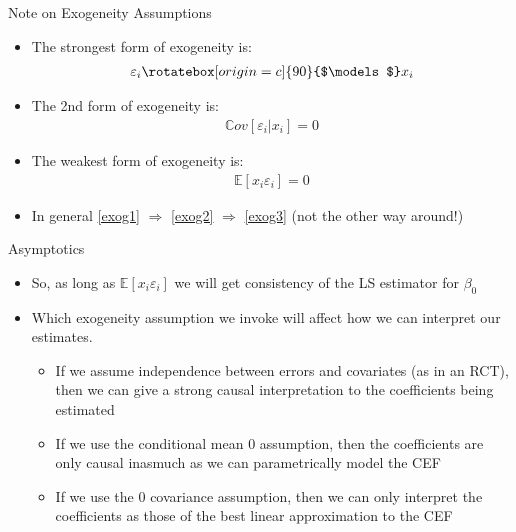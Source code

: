 \documentclass[fleqn, 10pt]{beamer}
\newcommand{\Cov}{\mathbb{C}ov}
\newcommand{\E}{\mathbb{E}}
\newcommand{\indep}{\rotatebox[origin=c]{90}{$\models$}}
\begin{document}
\begin{frame}{Note on Exogeneity Assumptions}
	
	\begin{itemize}
		\item The strongest form of exogeneity is:
		\begin{align} \label{exog1}
		\varepsilon_i \indep x_i
		\end{align}
		\item The 2nd form of exogeneity is:
		\begin{align} \label{exog2}
		\Cov[\varepsilon_i | x_i] = 0
		\end{align}
		\item The weakest form of exogeneity is:
		\begin{align} \label{exog3}
		\E[x_i \varepsilon_i] = 0
		\end{align}
		\item In general \eqref{exog1} \( \Rightarrow \) \eqref{exog2} \( \Rightarrow \) \eqref{exog3} (not the other way around!)
	\end{itemize}
	
\end{frame}

\begin{frame}{Asymptotics}
	
	\begin{itemize}
		\item So, as long as \( \E[x_i \varepsilon_i] \) we will get consistency of the LS estimator for \(\beta_0\)
		\item Which exogeneity assumption we invoke will affect how we can interpret our estimates.
		\begin{itemize}
			\item If we assume independence between errors and covariates (as in an RCT), then we can give a strong causal interpretation to the coefficients being estimated
			\item If we use the conditional mean 0 assumption, then the coefficients are only causal inasmuch as we can parametrically model the CEF
			\item If we use the 0 covariance assumption, then we can only interpret the coefficients as those of the best linear approximation to the CEF
		\end{itemize}
	\end{itemize}
	
\end{frame}
\end{document}
